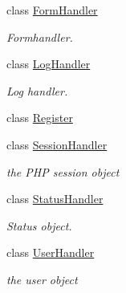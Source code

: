 \begin{CompactItemize}
class \hyperlink{classFormHandler}{FormHandler}
\begin{CompactList}\small\item\em Formhandler. \item\end{CompactList}\item 
class \hyperlink{classLogHandler}{LogHandler}
\begin{CompactList}\small\item\em Log handler. \item\end{CompactList}\item 
class \hyperlink{classRegister}{Register}
\item 
class \hyperlink{classSessionHandler}{SessionHandler}
\begin{CompactList}\small\item\em the PHP session object \item\end{CompactList}\item 
class \hyperlink{classStatusHandler}{StatusHandler}
\begin{CompactList}\small\item\em Status object. \item\end{CompactList}\item 
class \hyperlink{classUserHandler}{UserHandler}
\begin{CompactList}\small\item\em the user object \item\end{CompactList}\end{CompactItemize}
